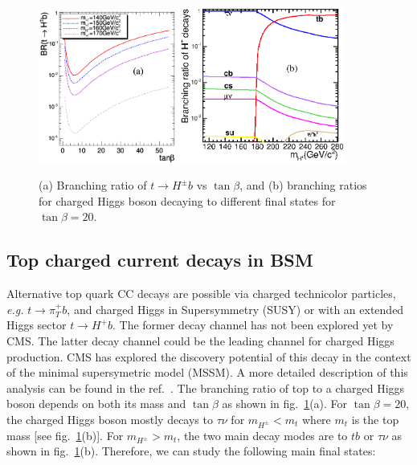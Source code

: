 \documentclass{cimento}
\begin{document}
\begin{figure}
\centering
\includegraphics[width=0.4\textwidth]{fig01a.ps}
\includegraphics[width=0.49\textwidth]{fig01b.ps}
\caption{(a) Branching ratio of $t\rightarrow H^{\pm}b$ vs $\tan \beta$,
and (b) branching ratios for charged Higgs boson decaying to different final
states for $\tan \beta=20$.}
\label{fig:fig1}
\end{figure}



\subsection{Top charged current decays in BSM}
\label{sec:CC}

Alternative top quark CC decays are possible via charged technicolor
particles, {\it e.g.} $t\rightarrow \pi^+_{T}b$,  and charged Higgs in 
Supersymmetry (SUSY) or with an extended Higgs sector $t\rightarrow H^{+}b$. 
The former
decay channel has not been explored yet by CMS. The latter decay channel
could be the leading channel for charged Higgs production. CMS has
explored the discovery potential of this decay in the context
of the minimal supersymetric model (MSSM). A more detailed
description of this analysis can be found in the ref.~\cite{ref:ptdr2}.
The branching ratio of top to a charged Higgs boson depends on both its
mass and $\tan \beta$ as shown in fig.~\ref{fig:fig1}(a). For $\tan \beta=20$,
the charged Higgs boson mostly decays to $\tau \nu$ for $m_{H^{\pm}}<m_{t}$ where
$m_{t}$ is the top mass [see fig.~\ref{fig:fig1}(b)]. For $m_{H^{\pm}}>m_{t}$, 
the two main decay modes are to $tb$ or $\tau \nu$ as shown in fig.~\ref{fig:fig1}(b).
Therefore, we can study the following main final states:
\end{document}
